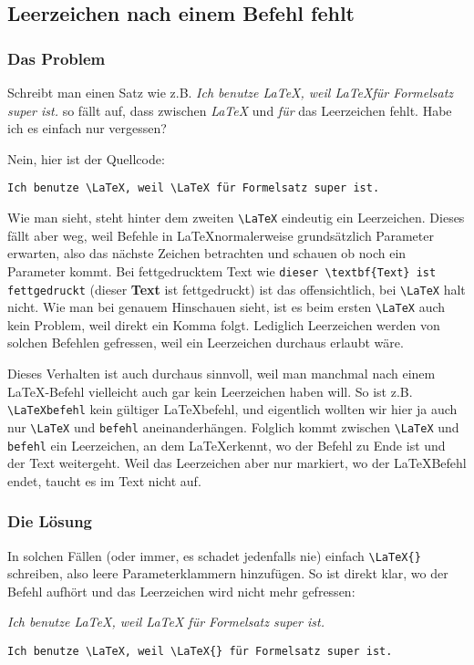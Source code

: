 	
		

		
		\subsection{Leerzeichen nach einem Befehl fehlt}
			\subsubsection*{Das Problem}
				Schreibt man einen Satz wie z.B. \emph{Ich benutze \LaTeX, weil \LaTeX für Formelsatz super ist.} so fällt auf, dass zwischen \emph{\LaTeX{}} und \emph{für} das Leerzeichen fehlt.			
				Habe ich es einfach nur vergessen?
				
				Nein, hier ist der Quellcode:
				\bigskip
				
				\lstinline[language=thesis-latexbeispiel, showspaces=true]|Ich benutze \LaTeX, weil \LaTeX für Formelsatz super ist.|
				\bigskip
			
				Wie man sieht, steht hinter dem zweiten \lstinline[language=thesis-latexbeispiel]|\LaTeX| eindeutig ein Leerzeichen. Dieses fällt aber weg, weil Befehle in \LaTeX normalerweise grundsätzlich Parameter erwarten, also das nächste Zeichen betrachten und schauen ob noch ein Parameter kommt. Bei fettgedrucktem Text wie \lstinline[language=thesis-latexbeispiel]|dieser \textbf{Text} ist fettgedruckt| (dieser \textbf{Text} ist fettgedruckt) ist das offensichtlich, bei \lstinline[language=thesis-latexbeispiel]|\LaTeX| halt nicht. Wie man bei genauem Hinschauen sieht, ist es beim ersten \lstinline[language=thesis-latexbeispiel]|\LaTeX| auch kein Problem, weil direkt ein Komma folgt. Lediglich Leerzeichen werden von solchen Befehlen \glqq gefressen\grqq, weil ein Leerzeichen durchaus erlaubt wäre.
				
				Dieses Verhalten ist auch durchaus sinnvoll, weil man manchmal nach einem \LaTeX-Befehl vielleicht auch gar kein Leerzeichen haben will. So ist z.B. \lstinline|\LaTeXbefehl| kein gültiger \LaTeX befehl, und eigentlich wollten wir hier ja auch nur \lstinline[language=thesis-latexbeispiel]|\LaTeX| und \lstinline|befehl| aneinanderhängen. Folglich kommt zwischen \lstinline[language=thesis-latexbeispiel]|\LaTeX| und \lstinline|befehl| ein Leerzeichen, an dem \LaTeX erkennt, wo der Befehl zu Ende ist und der Text weitergeht. Weil das Leerzeichen aber nur markiert, wo der \LaTeX Befehl endet, taucht es im Text nicht auf.
			\subsubsection*{Die Lösung}
				In solchen Fällen (oder immer, es schadet jedenfalls nie) einfach \lstinline[language=thesis-latexbeispiel]|\LaTeX{}| schreiben, also leere Parameterklammern hinzufügen. So ist direkt klar, wo der Befehl aufhört und das Leerzeichen wird nicht mehr \glqq gefressen\grqq:
				\bigskip
				
				\emph{Ich benutze \LaTeX, weil \LaTeX{} für Formelsatz super ist.}
				\medskip
				
				\lstinline[language=thesis-latexbeispiel, showspaces=true]|Ich benutze \LaTeX, weil \LaTeX{} für Formelsatz super ist.|